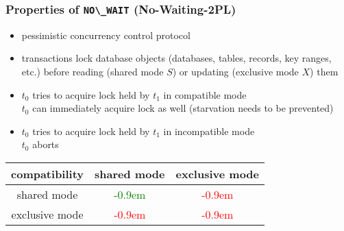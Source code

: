 \begin{frame}
	\frametitle{Properties of \lstinline{NO\_WAIT} (No-Waiting-2PL)}
	
	\begin{itemize}
		\item	pessimistic concurrency control protocol
		\item	transactions lock database objects (databases, tables, records, key ranges, etc.) before reading (shared mode $S$) or updating (exclusive mode $X$) them	\cite{Mohan:1990}
		\item	$t_0$ tries to acquire lock held by $t_1$ in compatible mode \\ \bm{$\rightarrow$} $t_0$ can immediately acquire lock as well (starvation needs to be prevented)
		\item	$t_0$ tries to acquire lock held by $t_1$ in incompatible mode \\ \bm{$\rightarrow$} $t_0$ aborts
	\end{itemize}
	\newcommand{\plus}{\textcolor{green!15}{\LARGE\raisebox{-.0875em}{\bm{$\bullet$}}}\textcolor{green}{\kern-0.9em\bm{$\oplus$}}}
	\newcommand{\minus}{\textcolor{red!25}{\LARGE\raisebox{-.0875em}{\bm{$\bullet$}}}\textcolor{red}{\kern-0.9em\bm{$\ominus$}}}
	
	\centering
	\begin{tabular}{| c | c | c |}
															\hline
		compatibility	&	shared mode	&	exclusive mode		\\	\hline
		shared mode	&	\plus			&	\minus			\\	\hline
		exclusive mode	&	\minus		&	\minus			\\	\hline
	\end{tabular}%
\end{frame}

